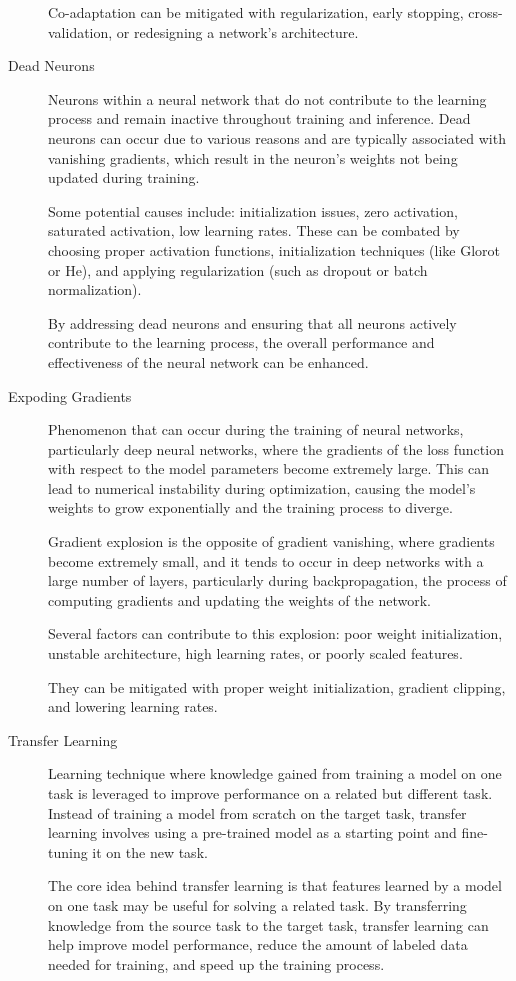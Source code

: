 \documentclass[a4paper]{report}
\begin{document}
\begin{description}
Co-adaptation can be mitigated with regularization, early stopping, cross-validation, or redesigning a network's architecture.

\item[Dead Neurons]
Neurons within a neural network that do not contribute to the learning process and remain inactive throughout training and inference. Dead neurons can occur due to various reasons and are typically associated with vanishing gradients, which result in the neuron's weights not being updated during training.

Some potential causes include: initialization issues, zero activation, saturated activation, low learning rates. These can be combated by choosing proper activation functions, initialization techniques (like Glorot or He), and applying regularization (such as dropout or batch normalization).

By addressing dead neurons and ensuring that all neurons actively contribute to the learning process, the overall performance and effectiveness of the neural network can be enhanced.

\item[Expoding Gradients]
Phenomenon that can occur during the training of neural networks, particularly deep neural networks, where the gradients of the loss function with respect to the model parameters become extremely large. This can lead to numerical instability during optimization, causing the model's weights to grow exponentially and the training process to diverge.

Gradient explosion is the opposite of gradient vanishing, where gradients become extremely small, and it tends to occur in deep networks with a large number of layers, particularly during backpropagation, the process of computing gradients and updating the weights of the network.

Several factors can contribute to this explosion: poor weight initialization, unstable architecture, high learning rates, or poorly scaled features.

They can be mitigated with proper weight initialization, gradient clipping, and lowering learning rates.

\item[Transfer Learning]
Learning technique where knowledge gained from training a model on one task is leveraged to improve performance on a related but different task. Instead of training a model from scratch on the target task, transfer learning involves using a pre-trained model as a starting point and fine-tuning it on the new task.

The core idea behind transfer learning is that features learned by a model on one task may be useful for solving a related task. By transferring knowledge from the source task to the target task, transfer learning can help improve model performance, reduce the amount of labeled data needed for training, and speed up the training process.
\end{description}
\end{document}
